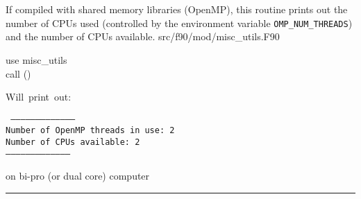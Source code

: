 
\sloppy


\section[brag\_openmp]{ }
\label{sub:brag_openmp}
\author{Eric Hivon}

\begin{facility}
{If compiled with shared memory libraries (OpenMP), this routine prints out the number of
CPUs used (controlled by the environment variable {\tt OMP\_NUM\_THREADS}) and the number of CPUs available.}
{src/f90/mod/misc\_utils.F90}
\end{facility}

\begin{f90format}
{}
\end{f90format}


\begin{example}
{
use misc\_utils \\
call \thedocid() \\
}
{
\parbox[t]{8.2cm}{
Will~print~out: \hfill\\
\parbox[t]{8cm}{\tt
-------------------------------------- \\
Number of OpenMP threads in use:    2 \\
Number of CPUs available:           2 \\
-------------------------------------- }
on bi-pro (or dual core) computer}
}
\end{example}



\rule{\hsize}{2mm}

\newpage
